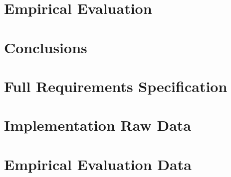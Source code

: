 \documentclass[11pt, a4paper, openright]{report}
\begin{document}
\chapter{Empirical Evaluation}
\label{c:evaluation}


\chapter{Conclusions}
\label{c:conclusions}




\begin{appendices}
\chapter{Full Requirements Specification}


\chapter{Implementation Raw Data}


\chapter{Empirical Evaluation Data}

	
\end{appendices}
\end{document}
